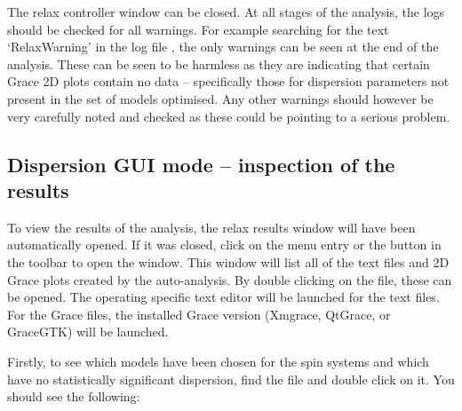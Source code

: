 The relax controller window can be closed.
At all stages of the analysis, the logs should be checked for all warnings.
For example searching for the text `RelaxWarning' in the log file , the only warnings can be seen at the end of the analysis.
These can be seen to be harmless as they are indicating that certain Grace 2D plots contain no data -- specifically those for dispersion parameters not present in the set of models optimised.
Any other warnings should however be very carefully noted and checked as these could be pointing to a serious problem.



\subsection{Dispersion GUI mode -- inspection of the results}

To view the results of the analysis, the relax results window will have been automatically opened.
If it was closed, click on the  menu entry or the  button in the toolbar to open the window.
This window will list all of the  text files and  2D Grace plots created by the auto-analysis.
By double clicking on the file, these can be opened.
The operating specific text editor will be launched for the text files.
For the Grace files, the installed Grace version (Xmgrace, QtGrace, or GraceGTK) will be launched.

Firstly, to see which models have been chosen for the spin systems and which have no statistically significant dispersion, find the  file and double click on it.
You should see the following:

